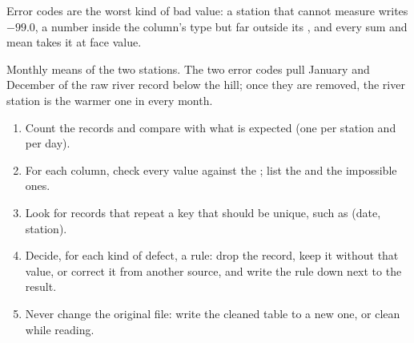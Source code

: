 Error codes are the worst kind of bad value: a station that cannot measure writes $-99.0$, a number inside the
column's type but far outside its , and every sum and mean takes it at face value.

\label{lst:g10:data-tables:clean-weather}

\label{out:g10:data-tables:clean-weather}

\begin{omfigure}

{\small Monthly means of the two stations. The two error codes pull January and December of the raw river record
below the hill; once they are removed, the river station is the warmer one in every month.}
\end{omfigure}

\begin{method}\label{met:g10:data-tables:clean}
\begin{enumerate}
  \item Count the records and compare with what is expected (one per station and per day).
  \item For each column, check every value against the ; list the  and the impossible ones.
  \item Look for records that repeat a key that should be unique, such as (date, station).
  \item Decide, for each kind of defect, a rule: drop the record, keep it without that value, or correct it from
    another source, and write the rule down next to the result.
  \item Never change the original file: write the cleaned table to a new one, or clean while reading.
\end{enumerate}
\end{method}


